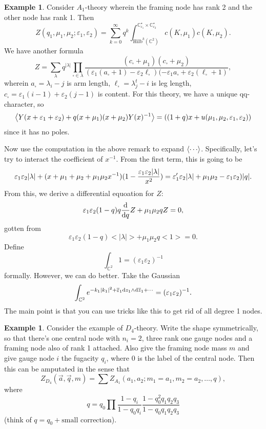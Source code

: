 \documentclass[leqno, openany]{memoir}
\theoremstyle{definition}
\newtheorem{exm}[thm]{Example}
\theoremstyle{remark}
\theoremstyle{plain}
\theoremstyle{definition}
\theoremstyle{remark}
\newcommand{\ep}{\varepsilon}
\newcommand{\mr}[1]{\mathrm{#1}}
\begin{document}
\begin{exm}
Consider $A_1$-theory wherein the framing node has rank 2 and the other node has rank 1. Then 
\[
Z(q_1, \mu_1,\mu_2;\ep_1,\ep_2) = \sum_{k=0}^\infty q^k \int^{\mathbb{C}^\star_{\ep_1} \times \mathbb{C}^\star_{\ep_2}}_{\mr{Hilb}^k(\mathbb{C}^2)} c(K,\mu_1) c(K,\mu_2).
\]
We have another formula 
\[
Z = \sum_\lambda q^{|\lambda|} \prod_{\square \in \lambda} \frac{(c_\square + \mu_1)(c_\square + \mu_2)}{(\ep_1(a_\square + 1) - \ep_2 \ell_\square)(-\ep_1 a_\square + \ep_2(\ell_\square + 1)},
\]
wherein $a_\square = \lambda_i - j$ is arm length, $\ell_\square = \lambda_j^t - i$ is leg length, $c_\square = \ep_1(i-1) + \ep_2(j-1)$ is content. 
For this theory, we have a unique qq-character, so 
\[
\ev{Y(x + \ep_1 + \ep_2) + q (x + \mu_1)(x + \mu_2) Y(x)^{-1}} = ( (1 + q)x + u(\mu_1,\mu_2,\ep_1,\ep_2))
\]
since it has no poles.

Now use the computation in the above remark to expand $\ev{\cdots}$. Specifically, let's try to interact the coefficient of $x^{-1}$. 
From the first term, this is going to be 
\[
    \ep_1 \ep_2 \abs{ \lambda } + (x + \mu_1 + \mu_2 + \mu_1 \mu_2 x^{-1})(1 - \frac{\ep_1 \ep_2 \abs{\lambda}}{x^2}) = \ep_1' \ep_2 \abs{\lambda} + \mu_1 \mu_2 -\ep_1 \ep_2)\abs{q}.
\]
From this, we derive a differential equoation for $Z$:
\[
\ep_1 \ep_2 (1-q) q \dv{q} Z + \mu_1 \mu_2 q Z = 0,
\]
gotten from 
\[
\ep_1 \ep_2 (1 - q) <|\lambda|> + \mu_1 \mu_2 q <1> = 0.
\]
Define
\[
\int_{\mathbb{C}^2} 1 = (\ep_1 \ep_2)^{-1} 
\]
formally. However, we can do better. Take the Gaussian
\[
\int_{\mathbb{C}^2} e^{-k_1 \abs{ k_1 }^2 + \overline{\ep}_1 \dd z_1 \wedge \dd\overline{z}_1 + \cdots}  = (\ep_1 \ep_2)^{-1}.
\]
The main point is that you can use tricks like this to get rid of all degree 1 nodes.
\end{exm}

\begin{exm}
Consider the example of $D_4$-theory. Write the shape symmetrically, so that there's one central node with $n_i = 2$, three rank one 
gauge nodes and a framing node also of rank 1 attached.
Also give the framing node mass $m$ and give gauge node $i$ the fugacity $q_i$, where $0$ is the label of the central node. 
Then this can be amputated in the sense that 
\[
Z_{D_4}(\vec{a},\vec{q}, m) = \sum Z_{A_1}(a_1,a_2;m_1 = a_1, m_2 = a_2,\dots, q),
\]
where
\[
q = q_0 \prod \frac{1 - q_i}{1 - q_0 q_i} \frac{1 - q_0^2 q_1 q_2 q_3}{1- q_0q_1q_2 q_3}
\]
(think of $q = q_0 + \text{small correction}$).
\end{exm}
\end{document}
